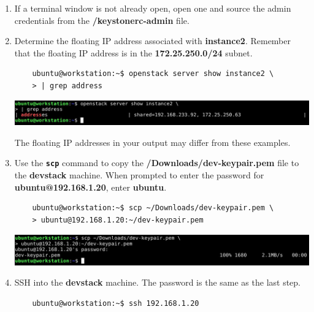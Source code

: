 \documentclass[letterpaper, 12pt]{article}
\begin{document}
\begin{enumerate}
    \item If a terminal window is not already open, open one and source the admin credentials from the 
    \textbf{\texttildemid/keystonerc-admin} file.

    \item Determine the floating IP address associated with \textbf{instance2}. Remember that the floating IP address is
    in the \textbf{172.25.250.0/24} subnet.
    \begin{lstlisting}
    ubuntu@workstation:~$ openstack server show instance2 \
    > | grep address
    \end{lstlisting}

    \begin{center}
        \includegraphics[width=\linewidth]{images/part2/step2.png}
    \end{center}

    \begin{notebox}
        The floating IP addresses in your output may differ from these examples.
    \end{notebox}

    \item Use the \textbf{\texttt{scp}} command to copy the \textbf{\texttildemid/Downloads/dev-keypair.pem} file to
    the \textbf{devstack} machine. When prompted to enter the password for \textbf{ubuntu@192.168.1.20}, enter
    \textbf{ubuntu}.
    \begin{lstlisting}
    ubuntu@workstation:~$ scp ~/Downloads/dev-keypair.pem \
    > ubuntu@192.168.1.20:~/dev-keypair.pem
    \end{lstlisting}

    \begin{center}
        \includegraphics[width=\linewidth]{images/part2/step3.png}
    \end{center}

    \item SSH into the \textbf{devstack} machine. The password is the same as the last step.
    \begin{lstlisting}
    ubuntu@workstation:~$ ssh 192.168.1.20
    \end{lstlisting}


\end{enumerate}
\end{document}
